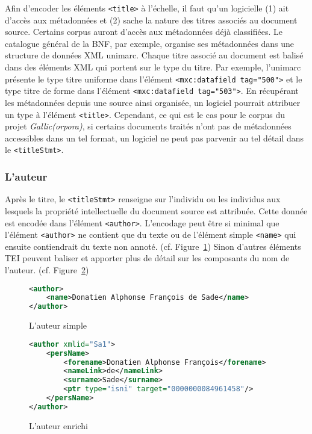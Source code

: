 \documentclass[class=article, crop=false]{standalone}
\begin{document}
Afin d'encoder les éléments \texttt{<title>} à l'échelle, il faut qu'un logicielle (1) ait d'accès aux métadonnées et (2) sache la nature des titres associés au document source. Certains corpus auront d'accès aux métadonnées déjà classifiées. Le catalogue général de la \acrshort{BNF}, par exemple, organise ses métadonnées dans une structure de données \acrshort{XML} \Gls{unimarc}. Chaque titre associé au document est balisé dans des éléments \acrshort{XML} qui portent sur le type du titre. Par exemple, l'\Gls{unimarc} présente le type \og{}titre uniforme\fg{} dans l'élément \texttt{<mxc:datafield tag="500">} et le type \og{}titre de forme\fg{} dans l'élément \texttt{<mxc:datafield tag="503">}. En récupérant les métadonnées depuis une source ainsi organisée, un logiciel pourrait attribuer un type à l'élément \texttt{<title>}. Cependant, ce qui est le cas pour le corpus du projet \textit{Gallic(orpora)}, si certains documents traités n'ont pas de métadonnées accessibles dans un tel format, un logiciel ne peut pas parvenir au tel détail dans le \texttt{<titleStmt>}.

\subsubsection{L'auteur}
Après le titre, le \texttt{<titleStmt>} renseigne sur l'individu ou les individus aux lesquels la propriété intellectuelle du document source est attribuée. Cette donnée est encodée dans l'élément \texttt{<author>}. L'encodage peut être si minimal que l'élément \texttt{<author>} ne contient que du texte ou de l'élément simple \texttt{<name>} qui ensuite contiendrait du texte non annoté. (cf. Figure~\ref{fig:authorsimple}) Sinon d'autres éléments \acrshort{TEI} peuvent baliser et apporter plus de détail sur les composants du nom de l'auteur. (cf. Figure~\ref{fig:authorcomplex})

\begin{figure}[ht]
\centering
\begin{lstlisting}[language=XML]
<author>
	<name>Donatien Alphonse François de Sade</name>
</author>
\end{lstlisting}
\caption{L'auteur simple}
\label{fig:authorsimple}
\end{figure}

\begin{figure}[ht]
\centering
\begin{lstlisting}[language=XML]
<author xmlid="Sa1">
	<persName>
		<forename>Donatien Alphonse François</forename>
		<nameLink>de</nameLink>
		<surname>Sade</surname>
		<ptr type="isni" target="0000000084961458"/>
	</persName>
</author>
\end{lstlisting}
\caption{L'auteur enrichi}
\label{fig:authorcomplex}
\end{figure}
\end{document}
